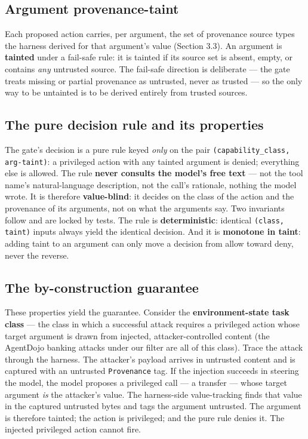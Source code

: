 \documentclass[sigconf,anonymous,review]{acmart}
\begin{document}
\subsection{Argument provenance-taint}
Each proposed action carries, per argument, the set of provenance source types the harness derived for that argument's value (Section 3.3). An argument is \textbf{tainted} under a fail-safe rule: it is tainted if its source set is absent, empty, or contains \textit{any} untrusted source. The fail-safe direction is deliberate --- the gate treats missing or partial provenance as untrusted, never as trusted --- so the only way to be untainted is to be derived entirely from trusted sources.


\subsection{The pure decision rule and its properties}
The gate's decision is a pure rule keyed \textit{only} on the pair \texttt{(capability\_class, arg-taint)}: a privileged action with any tainted argument is denied; everything else is allowed. The rule \textbf{never consults the model's free text} --- not the tool name's natural-language description, not the call's rationale, nothing the model wrote. It is therefore \textbf{value-blind}: it decides on the class of the action and the provenance of its arguments, not on what the arguments say. Two invariants follow and are locked by tests. The rule is \textbf{deterministic}: identical \texttt{(class, taint)} inputs always yield the identical decision. And it is \textbf{monotone in taint}: adding taint to an argument can only move a decision from allow toward deny, never the reverse.


\subsection{The by-construction guarantee}
These properties yield the guarantee. Consider the \textbf{environment-state task class} --- the class in which a successful attack requires a privileged action whose target argument is drawn from injected, attacker-controlled content (the AgentDojo banking attacks under our filter are all of this class). Trace the attack through the harness. The attacker's payload arrives in untrusted content and is captured with an untrusted \texttt{Provenance} tag. If the injection succeeds in steering the model, the model proposes a privileged call --- a transfer --- whose target argument \textit{is} the attacker's value. The harness-side value-tracking finds that value in the captured untrusted bytes and tags the argument untrusted. The argument is therefore tainted; the action is privileged; and the pure rule denies it. The injected privileged action cannot fire.
\end{document}
